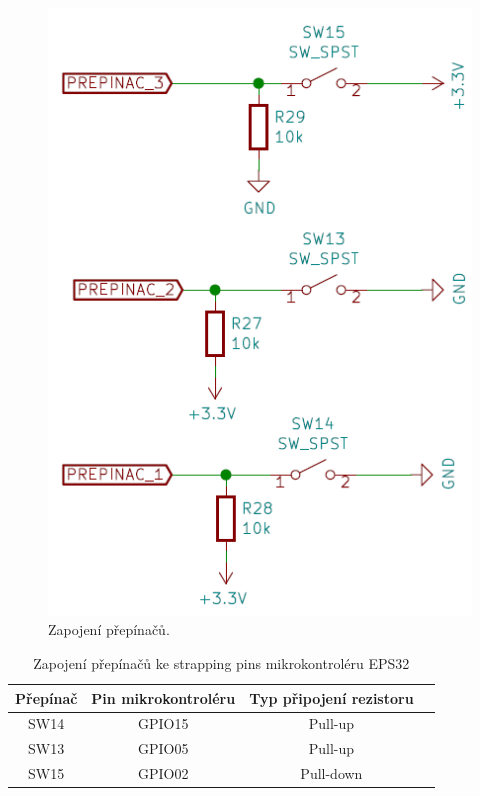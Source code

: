   \begin{figure}[!h]
    \begin{center}
      \includegraphics[scale=0.6]{obrazky/Prepinace_zapojeni.png}
    \end{center}
    \caption[Zapojení přepínačů]{Zapojení přepínačů.}
  \end{figure}

  \begin{table}[!h]
    \caption{Zapojení přepínačů ke strapping pins mikrokontroléru EPS32}
    \begin{center}
        \begin{tabular}{|c|c|c|c|}
            \hline
            {\bf Přepínač}   & {\bf Pin mikrokontroléru} & {\bf Typ připojení rezistoru} \\
            \hline
            SW14      & GPIO15 & Pull-up \\
            \hline
            SW13      & GPIO05 & Pull-up \\
            \hline
            SW15      & GPIO02 & Pull-down \\
            \hline
        \end{tabular}    
    \end{center}
  \end{table}

